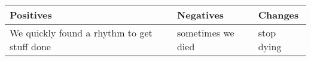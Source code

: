 \begin{center}
\begin{tabulary}
{ \textwidth }
{ J | J | J }
\textbf{Positives} & \textbf{Negatives} & \textbf{Changes} \\ \hline
We quickly found a rhythm to get stuff done & sometimes we died & stop dying
 
\end{tabulary}
\end{center}
